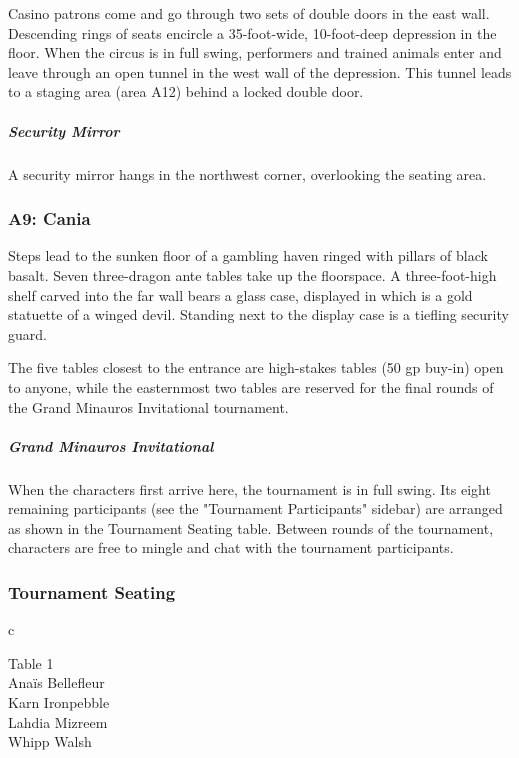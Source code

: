 \documentclass[10pt,a4paper,twoside,bg=print,twocolumn,openany,nodeprecatedcode]{dndbook}
\begin{document}
Casino patrons come and go through two sets of double doors in the east wall. Descending rings of seats encircle a 35-foot-wide, 10-foot-deep depression in the floor. When the circus is in full swing, performers and trained animals enter and leave through an open tunnel in the west wall of the depression. This tunnel leads to a staging area (area A12) behind a locked double door.

\subparagraph{Security Mirror}
A security mirror hangs in the northwest corner, overlooking the seating area.

\subsubsection{A9: Cania}
\begin{DndReadAloud}{}
Steps lead to the sunken floor of a gambling haven ringed with pillars of black basalt. Seven three-dragon ante tables take up the floorspace. A three-foot-high shelf carved into the far wall bears a glass case, displayed in which is a gold statuette of a winged devil. Standing next to the display case is a tiefling security guard.

\end{DndReadAloud}

The five tables closest to the entrance are high-stakes tables (50 gp buy-in) open to anyone, while the easternmost two tables are reserved for the final rounds of the Grand Minauros Invitational tournament.

\subparagraph{Grand Minauros Invitational}
When the characters first arrive here, the tournament is in full swing. Its eight remaining participants (see the "Tournament Participants" sidebar) are arranged as shown in the Tournament Seating table. Between rounds of the tournament, characters are free to mingle and chat with the tournament participants.

\subsubsection{Tournament Seating}

\begin{DndTable}{c}

Table 1\\
Anaïs Bellefleur\\
Karn Ironpebble\\
Lahdia Mizreem\\
Whipp Walsh\\
\end{DndTable}
\end{document}
